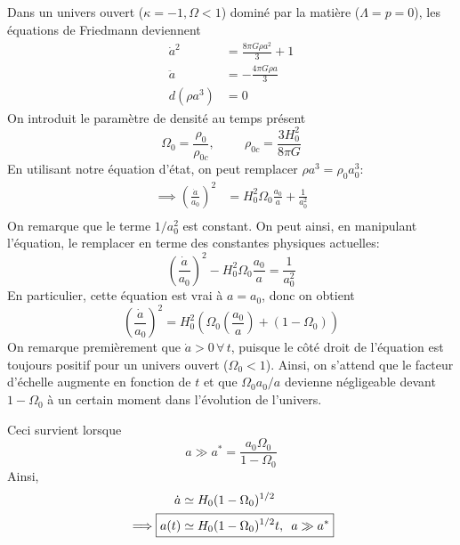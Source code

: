 \documentclass{article}
\numberwithin{equation}{section}
\begin{document}
\subsection{}
Dans un univers ouvert ($\kappa  = -1, \Omega < 1$) 
dominé par la matière ($\Lambda = p = 0$), les équations de Friedmann deviennent
\begin{align*}
        \dot{a}^{2} &=  \frac{8 \pi G \rho a^2}{3} + 1 \\
        \ddot{a} &=  -\frac{4\pi G \rho a}{3} \\
        d(\rho a^3) &=  0
\end{align*}
On introduit le paramètre de densité au temps présent 
\[
        \Omega_0 = \frac{\rho_0}{\rho_{0c}}, \hspace{1cm} \rho_{0c} = \frac{3H_0^2}{8 \pi G}
\]
En utilisant notre équation d'état, on peut remplacer $\rho a^{3} = \rho_0 a_0^{3}$:
\begin{align*}
        \implies \left( \frac{\dot{a}}{a_0} \right)^{2} 
        &= H_0^{2}\Omega_0 \frac{a_0}{a}  + \frac{1}{a_0^{2}} \\
\end{align*}
On remarque que le terme $1/a_0^2$ est constant. On peut ainsi, en manipulant 
l'équation, le remplacer en terme des constantes physiques actuelles:
\[
        \left( \frac{\dot{a}}{a_0} \right)^{2} - H_0^2 \Omega_0 \frac{a_0}{a} = \frac{1}{a_0^2}
\]
En particulier, cette équation est vrai à $a = a_0$, donc on obtient
\begin{equation}\label{eq:FriedDustOuvert} 
        \left( \frac{\dot{a}}{a_0} \right)^{2} 
        = H_0^{2} \left( \Omega_0 \left( \frac{a_0}{a}\right) + (1 - \Omega_0)  \right)
\end{equation} 
On remarque premièrement que $\dot{a} > 0\, \forall\, t$, puisque le côté droit 
de l'équation est toujours positif pour un univers ouvert ($\Omega_0 < 1$).
Ainsi, on s'attend que le facteur d'échelle 
augmente en fonction de $t$ et que $\Omega_0 a_0 /a$ devienne négligeable 
devant $1 - \Omega_0$ à un certain moment dans l'évolution de l'univers.

Ceci survient lorsque 
\[
        a \gg a^* = \frac{a_0\Omega_0}{1 - \Omega_0}
\]
Ainsi,
\begin{align*}
        \dot{a} &\simeq H_0 (1 - \Omega_0)^{1/2} \\
        \implies \Aboxed{a(t) &\simeq H_0 (1 - \Omega_0)^{1/2} t,\,\,\, a \gg a^*}
\end{align*}
\end{document}
